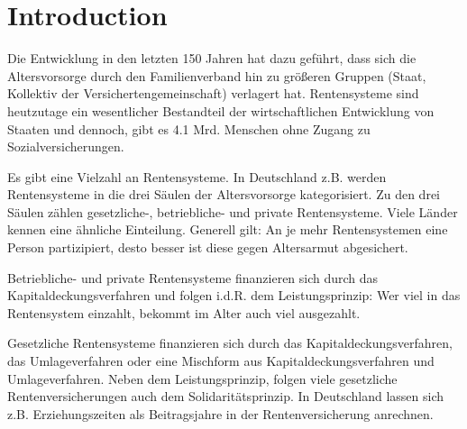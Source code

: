 \section{Introduction}


Die Entwicklung in den letzten 150 Jahren hat dazu geführt, dass sich die Altersvorsorge durch den Familienverband hin zu größeren Gruppen (Staat, Kollektiv der Versichertengemeinschaft) verlagert hat. Rentensysteme sind heutzutage ein wesentlicher Bestandteil der wirtschaftlichen Entwicklung von Staaten und dennoch, gibt es 4.1 Mrd. Menschen ohne Zugang zu Sozialversicherungen.\cite{ilo}

Es gibt eine Vielzahl an Rentensysteme. In Deutschland z.B. werden Rentensysteme in die drei Säulen der Altersvorsorge kategorisiert. Zu den drei Säulen zählen gesetzliche-, betriebliche- und private Rentensysteme. Viele Länder kennen eine ähnliche Einteilung. Generell gilt: An je mehr Rentensystemen eine Person partizipiert, desto besser ist diese gegen Altersarmut abgesichert.

Betriebliche- und private Rentensysteme finanzieren sich durch das Kapitaldeckungsverfahren und folgen i.d.R. dem Leistungsprinzip: Wer viel in das Rentensystem einzahlt, bekommt im Alter auch viel ausgezahlt.

Gesetzliche Rentensysteme finanzieren sich durch das Kapitaldeckungsverfahren, das Umlageverfahren oder eine Mischform aus Kapitaldeckungsverfahren und Umlageverfahren. Neben dem Leistungsprinzip, folgen viele gesetzliche Rentenversicherungen auch dem Solidaritätsprinzip. In Deutschland lassen sich z.B. Erziehungszeiten als Beitragsjahre in der Rentenversicherung anrechnen.


